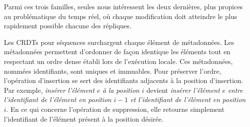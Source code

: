 




\noindent Parmi ces trois familles, seules nous intéressent les deux dernières,
plus propices au problématique du temps réel, où chaque modification doit
atteindre le plus rapidement possible chacune des répliques.

Les CRDTs pour séquences surchargent chaque élément de métadonnées. Les
métadonnées permettent d'ordonner de façon identique les éléments tout en
respectant un ordre dense établi lors de l'exécution locale. Ces métadonnées,
nommées identifiants, sont uniques et immuables. Pour préserver l'ordre,
l'opération d'insertion se sert des identifiants adjacents à la position
d'insertion. Par exemple, \emph{insérer l'élément $e$ à la position $i$} devient
\emph{insérer l'élément $e$ entre l'identifiant de l'élément en position $i-1$
  et l'identifiant de l'élément en position $i$}. En ce qui concerne l'opération
de suppression, elle retourne simplement l'identifiant de l'élément présent à la
position désirée.


